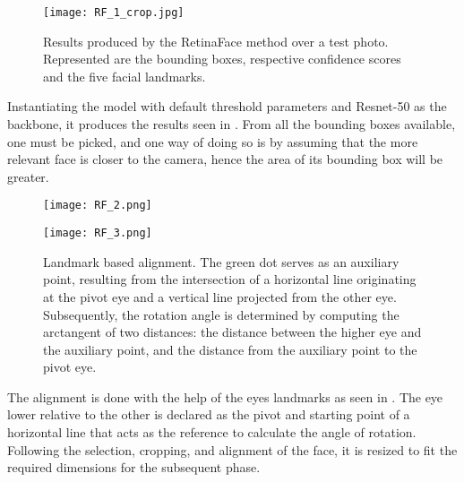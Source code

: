 \documentclass[class=report, crop=false, a4paper, 12pt]{standalone}
\begin{document}
\begin{figure}[!h]
    \centering
    \texttt{[image: RF\_1\_crop.jpg]}
    \caption{Results produced by the RetinaFace method over a test photo. Represented are the bounding boxes, respective confidence scores and the five facial landmarks.}
    \label{fig:rf_1}
\end{figure}

\newpage
Instantiating the model with default threshold parameters and Resnet-50 as the backbone, it produces the results seen in . From all the bounding boxes available, one must be picked, and one way of doing so is by assuming that the more relevant face is closer to the camera, hence the area of its bounding box will be greater.

\begin{figure}[h]
    \centering
    \begin{minipage}[c]{0.48\textwidth}
      \centering
      \texttt{[image: RF\_2.png]}
      \label{fig:rf_2}
    \end{minipage}
    \hfill
    \begin{minipage}[c]{0.48\textwidth}
      \centering
      \texttt{[image: RF\_3.png]}
      \label{fig:rf_3}
    \end{minipage} 
    \caption{Landmark based alignment. The green dot serves as an auxiliary point, resulting from the intersection of a horizontal line originating at the pivot eye and a vertical line projected from the other eye. Subsequently, the rotation angle is determined by computing the arctangent of two distances: the distance between the higher eye and the auxiliary point, and the distance from the auxiliary point to the pivot eye.}
    \label{fig:rf_2_3}
\end{figure}

\par The alignment is done with the help of the eyes landmarks as seen in . The eye lower relative to the other is declared as the pivot and starting point of a horizontal line that acts as the reference to calculate the angle of rotation. Following the selection, cropping, and alignment of the face, it is resized to fit the required dimensions for the subsequent phase.
\end{document}
